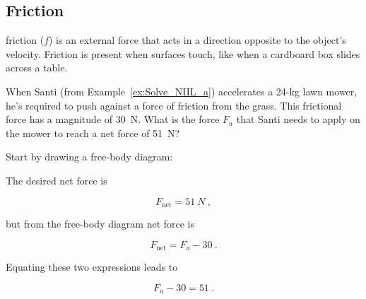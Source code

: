 \documentclass{article}
\numberwithin{equation}{section}
\numberwithin{figure}{section}
\begin{document}
\clearpage

\subsection{Friction} \label{lk8L5k}

\Gls{friction} ($f$) is an external force that acts in a direction opposite to the object's velocity. Friction is present when surfaces touch, like when a cardboard box slides across a table.

\begin{example}
When Santi (from Example~\ref{ex:Solve_NIIL_a}) accelerates a 24-kg lawn mower, he's required to push against a force of friction from the grass. This frictional force has a magnitude of \SI{30}{N}. What is the force $F_a$ that Santi needs to apply on the mower to reach a net force of \SI{51}{N}?
\end{example}

\Solution Start by drawing a free-body diagram:

\begin{figure}[h!]
\centering
{}
\end{figure}

The desired net force is

\begin{equation*}
    F_{\text{net}} = \SI{51}{N}\ ,
\end{equation*}

but from the free-body diagram net force is

\begin{equation*}
    F_{\text{net}} = F_a - 30\ .
\end{equation*}

Equating these two expressions leads to

\begin{equation*}
    F_a - 30 = 51\ .
\end{equation*}
\end{document}
